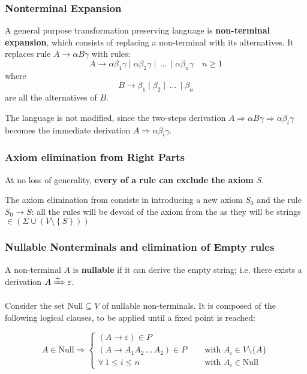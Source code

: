 \documentclass[english]{article}
\begin{document}
\subsubsection{Nonterminal Expansion}
\label{sec:non-terminal-expansion}

A general purpose transformation preserving language is \textbf{non-terminal expansion}, which consists of replacing a non-terminal with its alternatives.
It replaces rule \(A \rightarrow \alpha B \gamma\) with rules:
\[ A \rightarrow \alpha \beta_1 \gamma \mid \alpha \beta_2 \gamma \mid \,\ldots\, \mid \alpha \beta_n \gamma \quad n \geq 1 \]
where
\[ B \rightarrow \beta_1 \mid \beta_2 \mid \,\ldots\, \mid \beta_n \] are all the alternatives of \(B\).

The language is not modified, since the two-steps derivation \(A \Rightarrow \alpha B \gamma \Rightarrow \alpha \beta_i \gamma\) becomes the immediate derivation \(A \Rightarrow \alpha \beta_i \gamma\).

\subsubsection{Axiom elimination from Right Parts}
\label{sec:axiom-elimination-from-right-parts}

At no loss of generality, \textbf{every \RP of a rule can exclude the axiom} \(S\).

The axiom elimination from \RP consists in introducing a new axiom \(S_0\) and the rule \(S_0 \rightarrow S\):
all the rules will be devoid of the axiom from the \RP as they will be strings \(\in \left( \Sigma \cup \left( V \setminus \left\{ S \right\} \right) \right)\)

\subsubsection{Nullable Nonterminals and elimination of Empty rules}
\label{sec:nullable-non-terminals-and-elimination-of-empty-rules}

A non-terminal \(A\) is \textbf{nullable} if it can derive the empty string;
i.e. there exists a derivation \(A \xRightarrow{+} \varepsilon\).

Consider the set \(\text{Null} \subseteq V\) of nullable non-terminals.
It is composed of the following logical clauses, to be applied until a fixed point is reached:

\[
  A \in \text{Null} \Rightarrow
  \begin{cases}
    (A \rightarrow \varepsilon) \in P                                                            \\
    (A \rightarrow A_1 A_2 \,\ldots\, A_2) \in P \quad & \text{ with } A_i \in V \setminus \{A\} \\
    \forall \, 1 \leq i \leq n \quad                   & \text{ with } A_i \in \text{Null}
  \end{cases}
\]
\end{document}
